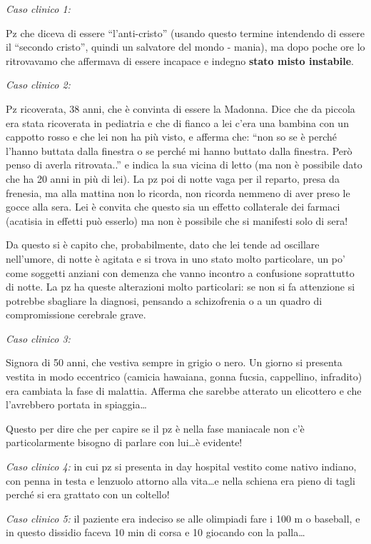 \documentclass[]{article}
\begin{document}
\emph{Caso clinico 1:}

Pz che diceva di essere ``l'anti-cristo'' (usando questo termine
intendendo di essere il ``secondo cristo'', quindi un salvatore del
mondo - mania), ma dopo poche ore lo ritrovavamo che affermava di essere
incapace e indegno \textbf{stato misto instabile}.

\emph{Caso clinico 2:}

Pz ricoverata, 38 anni, che è convinta di essere la Madonna. Dice che da
piccola era stata ricoverata in pediatria e che di fianco a lei c'era
una bambina con un cappotto rosso e che lei non ha più visto, e afferma
che: ``non so se è perché l'hanno buttata dalla finestra o se perché mi
hanno buttato dalla finestra. Però penso di averla ritrovata..'' e
indica la sua vicina di letto (ma non è possibile dato che ha 20 anni in
più di lei). La pz poi di notte vaga per il reparto, presa da frenesia,
ma alla mattina non lo ricorda, non ricorda nemmeno di aver preso le
gocce alla sera. Lei è convita che questo sia un effetto collaterale dei
farmaci (acatisia in effetti può esserlo) ma non è possibile che si
manifesti solo di sera!

Da questo si è capito che, probabilmente, dato che lei tende ad
oscillare nell'umore, di notte è agitata e si trova in uno stato molto
particolare, un po' come soggetti anziani con demenza che vanno incontro
a confusione soprattutto di notte. La pz ha queste alterazioni molto
particolari: se non si fa attenzione si potrebbe sbagliare la diagnosi,
pensando a schizofrenia o a un quadro di compromissione cerebrale grave.

\emph{Caso clinico 3:}

Signora di 50 anni, che vestiva sempre in grigio o nero. Un giorno si
presenta vestita in modo eccentrico (camicia hawaiana, gonna fucsia,
cappellino, infradito) era cambiata la fase di malattia. Afferma che
sarebbe atterato un elicottero e che l'avrebbero portata in
spiaggia\ldots{}

Questo per dire che per capire se il pz è nella fase maniacale non c'è
particolarmente bisogno di parlare con lui\ldots{}è evidente!

\emph{Caso clinico 4:} in cui pz si presenta in day hospital vestito
come nativo indiano, con penna in testa e lenzuolo attorno alla
vita\ldots{}e nella schiena era pieno di tagli perché si era grattato
con un coltello!

\emph{Caso clinico 5:} il paziente era indeciso se alle olimpiadi fare i
100 m o baseball, e in questo dissidio faceva 10 min di corsa e 10
giocando con la palla\ldots{}
\end{document}
